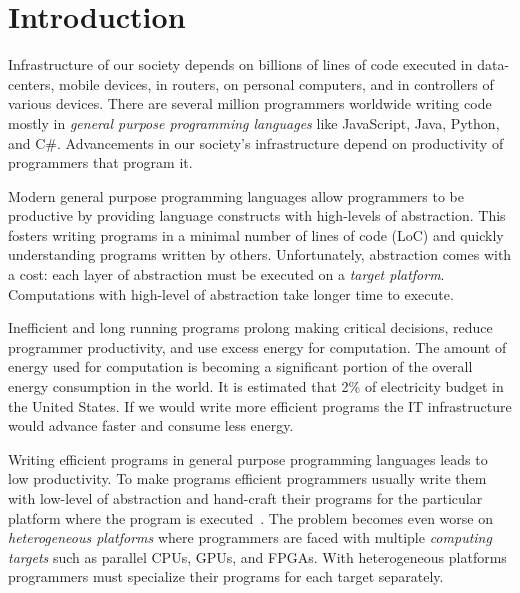 \chapter{Introduction}
\label{sct:introduction}

Infrastructure of our society depends on billions of lines of code executed in data-centers,
 mobile devices, in routers, on personal computers, and in controllers of various devices. There are
 several million programmers worldwide writing code mostly in \emph{general purpose programming languages} like JavaScript, Java, Python, and C\#. Advancements in our society's infrastructure depend on productivity of programmers that program it.

Modern general purpose programming languages allow programmers to be productive by
 providing language constructs with high-levels of abstraction. This fosters writing
 programs in a minimal number of lines of code (LoC) and quickly understanding
 programs written by others. Unfortunately, abstraction comes with a cost: each layer of
 abstraction must be executed on a \emph{target platform}. Computations with high-level
 of abstraction take longer time to execute.

Inefficient and long running programs prolong making critical decisions,
 reduce programmer productivity, and use excess energy for computation. The amount of energy used for
 computation is becoming a significant portion of the overall energy consumption in the world. It is estimated
 that 2\% \cite{mukherjee2009spatio} of electricity budget in the United States. If we would write more efficient
 programs the IT infrastructure would advance faster and consume less energy.

Writing efficient programs in general purpose programming languages leads to low productivity.
 To make programs efficient programmers usually write them with low-level of abstraction and hand-craft their programs for the particular platform where the program is executed~\cite{lee2011implementing}. The problem becomes even worse on \emph{heterogeneous platforms} where programmers are faced with multiple \emph{computing targets} such as parallel CPUs, GPUs, and FPGAs. With heterogeneous
 platforms programmers must specialize their programs for each target separately.

